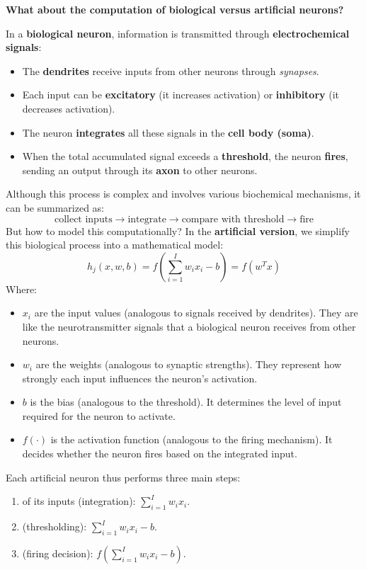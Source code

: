\begin{flushleft}
    \textcolor{Green3}{ \textbf{What about the computation of biological versus artificial neurons?}}
\end{flushleft}
\textcolor{Red2}{} In a \textbf{biological neuron}, information is transmitted through \textbf{electrochemical signals}:
\begin{itemize}
    \item The \textbf{dendrites} receive inputs from other neurons through \emph{synapses}.
    \item Each input can be \textbf{excitatory} (it increases activation) or \textbf{inhibitory} (it decreases activation).
    \item The neuron \textbf{integrates} all these signals in the \textbf{cell body (soma)}.
    \item When the total accumulated signal exceeds a \textbf{threshold}, the neuron \textbf{fires}, sending an output through its \textbf{axon} to other neurons.
\end{itemize}
Although this process is complex and involves various biochemical mechanisms, it can be summarized as:
\begin{equation*}
    \text{collect inputs} \rightarrow \text{integrate} \rightarrow \text{compare with threshold} \rightarrow \text{fire}
\end{equation*}
\textcolor{Red2}{} But how to model this computationally? In the \textbf{artificial version}, we simplify this biological process into a mathematical model:
\begin{equation*}
    h_{j}\left(x, w, b\right) = f\left(\sum_{i=1}^{I} w_{i} x_{i} - b\right) = f\left(w^{T} x\right)
\end{equation*}
Where:
\begin{itemize}
    \item $x_{i}$ are the input values (analogous to signals received by dendrites). They are like the neurotransmitter signals that a biological neuron receives from other neurons.
    \item $w_{i}$ are the weights (analogous to synaptic strengths). They represent how strongly each input influences the neuron's activation.
    \item $b$ is the bias (analogous to the threshold). It determines the level of input required for the neuron to activate.
    \item $f\left(\cdot\right)$ is the activation function (analogous to the firing mechanism). It decides whether the neuron fires based on the integrated input.
\end{itemize}
Each artificial neuron thus performs three main steps:
\begin{enumerate}
    \item {} of its inputs (integration): $\sum_{i=1}^{I} w_{i} x_{i}$.
    \item {} (thresholding): $\sum_{i=1}^{I} w_{i} x_{i} - b$.
    \item {} (firing decision): $f\left(\sum_{i=1}^{I} w_{i} x_{i} - b\right)$.
\end{enumerate}

